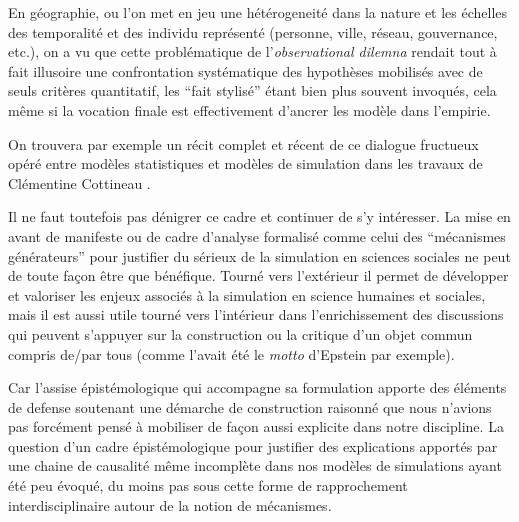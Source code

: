 En géographie, ou l'on met en jeu une hétérogeneité dans la nature et les échelles des temporalité et des individu représenté (personne, ville, réseau, gouvernance, etc.), on a vu que cette problématique de l'\textit{observational dilemna} rendait tout à fait illusoire une confrontation systématique des hypothèses mobilisés avec de seuls critères quantitatif, les \enquote{fait stylisé} étant bien plus souvent invoqués, cela même si la vocation finale est effectivement d'ancrer les modèle dans l'empirie.

On trouvera par exemple un récit complet et récent de ce dialogue fructueux opéré entre modèles statistiques et modèles de simulation dans les travaux de Clémentine Cottineau \autocites{Cottineau2014a, Cottineau2014b}.

Il ne faut toutefois pas dénigrer ce cadre et continuer de s'y intéresser. La mise en avant de manifeste \textcite{Conte2012} ou de cadre d'analyse formalisé comme celui des \enquote{mécanismes générateurs} pour justifier du sérieux de la simulation en sciences sociales ne peut de toute façon être que bénéfique. Tourné vers l'extérieur il permet de développer et valoriser les enjeux associés à la simulation en science humaines et sociales, mais il est aussi utile tourné vers l'intérieur dans l'enrichissement des discussions qui peuvent s'appuyer sur la construction ou la critique d'un objet commun compris de/par tous (comme l'avait été le \textit{motto} d'Epstein par exemple).

Car l'assise épistémologique qui accompagne sa formulation apporte des éléments de defense soutenant une démarche de construction raisonné que nous n'avions pas forcément pensé à mobiliser de façon aussi explicite dans notre discipline. La question d'un cadre épistémologique pour justifier des explications apportés par une chaine de causalité même incomplète dans nos modèles de simulations ayant été peu évoqué, du moins pas sous cette forme de rapprochement interdisciplinaire autour de la notion de mécanismes. 




